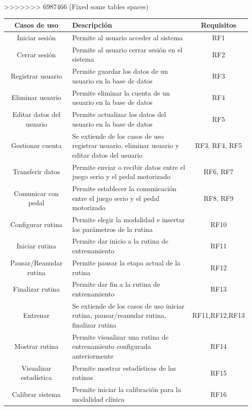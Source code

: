 \begin{table}[!ht]
>>>>>>> 6987466 (Fixed some tables spaces)
    \centering
    \begin{tabularx}{\textwidth}{|c|X|c|}
        \hline
        \textbf{Casos de uso} & \textbf{Descripción} & \textbf{Requisitos}\\\hline
        Iniciar sesión & Permite al usuario acceder al sistema & RF1\\\hline
        Cerrar sesión & Permite al usuario cerrar sesión en el sistema & RF2\\\hline
        Registrar usuario & Permite guardar los datos de un usuario en la base de datos & RF3\\\hline
        Eliminar usuario & Permite eliminar la cuenta de un usuario en la base de datos & RF4\\\hline
        Editar datos del usuario & Permite actualizar los datos del usuario en la base de datos & RF5\\\hline
        Gestionar cuenta  & Se extiende de los casos de uso registrar usuario, eliminar usuario y editar datos del usuario & RF3, RF4, RF5 \\\hline
        Transferir datos & Permite enviar o recibir datos entre el juego serio y el pedal motorizado & RF6, RF7\\\hline
        Comunicar con pedal & Permite establecer la comunicación entre el juego serio y el pedal motorizado & RF8, RF9\\\hline
        Configurar rutina & Permite elegir la modalidad e insertar los parámetros de la rutina  & RF10\\\hline
        Iniciar rutina & Permite dar inicio a la rutina de entrenamiento & RF11\\\hline
        Pausar/Reanudar rutina & Permite pausar la etapa actual de la rutina & RF12\\\hline
        Finalizar rutina & Permite dar fin a la rutina de entrenamiento & RF13\\\hline
        Entrenar & Se extiende de los casos de uso  iniciar rutina, pausar/reanudar rutina, finalizar rutina&RF11,RF12,RF13\\\hline
        Mostrar rutina & Permite visualizar una rutina de entrenamiento configurada anteriormente &RF14\\\hline
        Visualizar estadística & Permite mostrar estadísticas de las rutinas & RF15\\\hline
        Calibrar sistema & Permite iniciar la calibración para la modalidad clínica  & RF16\\\hline

\end{tabularx}
\end{table}
